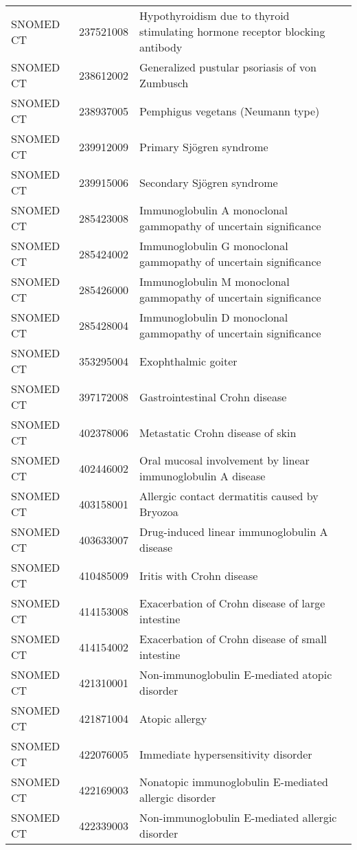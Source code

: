 \begin{longtable}{p{}p{}p{}}
  SNOMED CT & 237521008 & Hypothyroidism due to thyroid stimulating hormone receptor blocking antibody \\ 
  SNOMED CT & 238612002 & Generalized pustular psoriasis of von Zumbusch \\ 
  SNOMED CT & 238937005 & Pemphigus vegetans (Neumann type) \\ 
  SNOMED CT & 239912009 & Primary Sjögren syndrome \\ 
  SNOMED CT & 239915006 & Secondary Sjögren syndrome \\ 
  SNOMED CT & 285423008 & Immunoglobulin A monoclonal gammopathy of uncertain significance \\ 
  SNOMED CT & 285424002 & Immunoglobulin G monoclonal gammopathy of uncertain significance \\ 
  SNOMED CT & 285426000 & Immunoglobulin M monoclonal gammopathy of uncertain significance \\ 
  SNOMED CT & 285428004 & Immunoglobulin D monoclonal gammopathy of uncertain significance \\ 
  SNOMED CT & 353295004 & Exophthalmic goiter \\ 
  SNOMED CT & 397172008 & Gastrointestinal Crohn disease \\ 
  SNOMED CT & 402378006 & Metastatic Crohn disease of skin \\ 
  SNOMED CT & 402446002 & Oral mucosal involvement by linear immunoglobulin A disease \\ 
  SNOMED CT & 403158001 & Allergic contact dermatitis caused by Bryozoa \\ 
  SNOMED CT & 403633007 & Drug-induced linear immunoglobulin A disease \\ 
  SNOMED CT & 410485009 & Iritis with Crohn disease \\ 
  SNOMED CT & 414153008 & Exacerbation of Crohn disease of large intestine \\ 
  SNOMED CT & 414154002 & Exacerbation of Crohn disease of small intestine \\ 
  SNOMED CT & 421310001 & Non-immunoglobulin E-mediated atopic disorder \\ 
  SNOMED CT & 421871004 & Atopic allergy \\ 
  SNOMED CT & 422076005 & Immediate hypersensitivity disorder \\ 
  SNOMED CT & 422169003 & Nonatopic immunoglobulin E-mediated allergic disorder \\ 
  SNOMED CT & 422339003 & Non-immunoglobulin E-mediated allergic disorder \\ 

\end{longtable}
